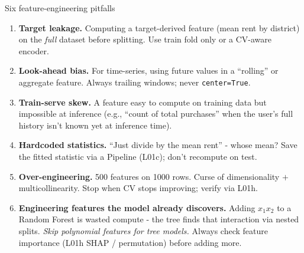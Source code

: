 \documentclass[aspectratio=169]{beamer}
\begin{document}
\begin{frame}{Six feature-engineering pitfalls}
  \begin{enumerate}\small
    \item \textbf{Target leakage.} Computing a target-derived feature (mean rent by district) on the \emph{full} dataset before splitting. Use train fold only or a CV-aware encoder.
    \item \textbf{Look-ahead bias.} For time-series, using future values in a ``rolling'' or aggregate feature. Always trailing windows; never \texttt{center=True}.
    \item \textbf{Train-serve skew.} A feature easy to compute on training data but impossible at inference (e.g., ``count of total purchases'' when the user's full history isn't known yet at inference time).
    \item \textbf{Hardcoded statistics.} ``Just divide by the mean rent'' - whose mean? Save the fitted statistic via a Pipeline (L01c); don't recompute on test.
    \item \textbf{Over-engineering.} 500 features on 1000 rows. Curse of dimensionality $+$ multicollinearity. Stop when CV stops improving; verify via L01h.
    \item \textbf{Engineering features the model already discovers.} Adding $x_1 x_2$ to a Random Forest is wasted compute - the tree finds that interaction via nested splits. \emph{Skip polynomial features for tree models.} Always check feature importance (L01h SHAP / permutation) before adding more.
  \end{enumerate}
\end{frame}
\end{document}

